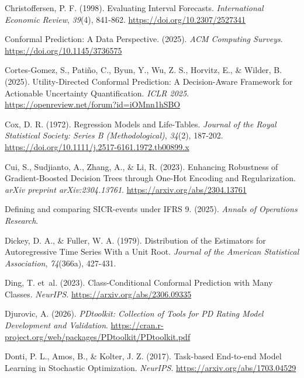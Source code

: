 \documentclass[
  spanish,
  11pt,
  letterpaper,
]{scrbook}
\newlength{\cslhangindent}
\newenvironment{CSLReferences}[2] %
 {\begin{list}{}{%
  \setlength{\itemindent}{0pt}
  \setlength{\leftmargin}{0pt}
  \setlength{\parsep}{0pt}
  \ifodd #1
   \setlength{\leftmargin}{\cslhangindent}
   \setlength{\itemindent}{-1\cslhangindent}
  \fi
  \setlength{\itemsep}{#2\baselineskip}}}
 {\end{list}}
\theoremstyle{plain}
\theoremstyle{remark}
\begin{document}
\begin{CSLReferences}{1}{0}
Christoffersen, P. F. (1998). Evaluating Interval Forecasts.
\emph{International Economic Review}, \emph{39}(4), 841-862.
\url{https://doi.org/10.2307/2527341}

Conformal Prediction: A Data Perspective. (2025). \emph{ACM Computing
Surveys}. \url{https://doi.org/10.1145/3736575}

Cortes-Gomez, S., Patiño, C., Byun, Y., Wu, Z. S., Horvitz, E., \&
Wilder, B. (2025). Utility-Directed Conformal Prediction: A
Decision-Aware Framework for Actionable Uncertainty Quantification.
\emph{ICLR 2025}. \url{https://openreview.net/forum?id=iOMnn1hSBO}

Cox, D. R. (1972). Regression Models and Life-Tables. \emph{Journal of
the Royal Statistical Society: Series B (Methodological)}, \emph{34}(2),
187-202. \url{https://doi.org/10.1111/j.2517-6161.1972.tb00899.x}

Cui, S., Sudjianto, A., Zhang, A., \& Li, R. (2023). Enhancing
Robustness of Gradient-Boosted Decision Trees through One-Hot Encoding
and Regularization. \emph{arXiv preprint arXiv:2304.13761}.
\url{https://arxiv.org/abs/2304.13761}

Defining and comparing {SICR}-events under {IFRS} 9. (2025).
\emph{Annals of Operations Research}.

Dickey, D. A., \& Fuller, W. A. (1979). Distribution of the Estimators
for Autoregressive Time Series With a Unit Root. \emph{Journal of the
American Statistical Association}, \emph{74}(366a), 427-431.

{Ding, T. et~al.} (2023). Class-Conditional Conformal Prediction with
Many Classes. \emph{NeurIPS}. \url{https://arxiv.org/abs/2306.09335}

Djurovic, A. (2026). \emph{PDtoolkit: Collection of Tools for PD Rating
Model Development and Validation}.
\url{https://cran.r-project.org/web/packages/PDtoolkit/PDtoolkit.pdf}

Donti, P. L., Amos, B., \& Kolter, J. Z. (2017). Task-based End-to-end
Model Learning in Stochastic Optimization. \emph{NeurIPS}.
\url{https://arxiv.org/abs/1703.04529}


\end{CSLReferences}
\end{document}
